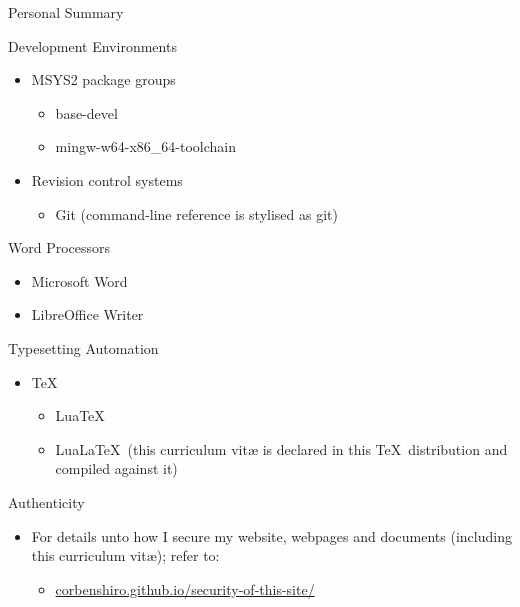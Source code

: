 \documentclass[]{mcdowellcv}
\begin{document}
\begin{cvsection}{Personal Summary}
\begin{cvsubsection}{Development Environments}{}{}
\begin{itemize}
				\item MSYS2 package groups
				\begin{itemize}
					\item base-devel
					\item mingw-w64-x86\_64-toolchain
				\end{itemize}
				\item Revision control systems
				\begin{itemize}
					\item Git (command-line reference is stylised as git)
				\end{itemize}
			\end{itemize}
		\end{cvsubsection}
		\begin{cvsubsection}{Word Processors}{}{}
			\begin{itemize}
				\item Microsoft Word
				\item LibreOffice Writer
			\end{itemize}
		\end{cvsubsection}
		\begin{cvsubsection}{Typesetting Automation}{}{}
			\begin{itemize}
				\item \TeX
				\begin{itemize}
					\item Lua\TeX
					\item Lua\LaTeX\ (this curriculum vitæ is declared in this \TeX\ distribution and compiled against it)
				\end{itemize}
			\end{itemize}
		\end{cvsubsection}
	\end{cvsection}

	\begin{cvsection}{Authenticity}
		\begin{cvsubsection}{}{}{}
			\begin{itemize}
				\item For details unto how I secure my website, webpages and documents (including this curriculum vitæ); refer to:
				\begin{itemize}
					\item \href{https://corbenshiro.github.io/security-of-this-site/}{corbenshiro.github.io/security-of-this-site/}
				\end{itemize}
			\end{itemize}
		\end{cvsubsection}
	\end{cvsection}
\end{document}
